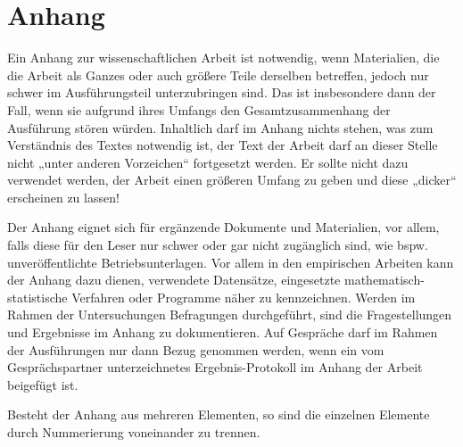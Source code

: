 
\section*{Anhang}
\label{Anhang}

Ein Anhang zur wissenschaftlichen Arbeit ist notwendig, wenn Materialien, die die Arbeit als Ganzes oder auch größere Teile derselben betreffen, jedoch nur schwer im Ausführungsteil unterzubringen sind. Das ist insbesondere dann der Fall, wenn sie aufgrund ihres Umfangs den Gesamtzusammenhang der Ausführung stören würden. Inhaltlich darf im Anhang nichts stehen, was zum Verständnis des Textes notwendig ist, der Text der Arbeit darf an dieser Stelle nicht „unter anderen Vorzeichen“ fortgesetzt werden. Er sollte nicht dazu verwendet werden, der Arbeit einen größeren Umfang zu geben und diese „dicker“ erscheinen zu lassen!

Der Anhang eignet sich für ergänzende Dokumente und Materialien, vor allem, falls diese für den Leser nur schwer oder gar nicht zugänglich sind, wie bspw. unveröffentlichte Betriebsunterlagen.
Vor allem in den empirischen Arbeiten kann der Anhang dazu dienen, verwendete Datensätze, eingesetzte mathematisch-statistische Verfahren oder Programme näher zu kennzeichnen. Werden im Rahmen der Untersuchungen Befragungen durchgeführt, sind die Fragestellungen und Ergebnisse im Anhang zu dokumentieren. Auf Gespräche darf im Rahmen der Ausführungen nur dann Bezug genommen werden, wenn ein vom Gesprächspartner unterzeichnetes Ergebnis-Protokoll im Anhang der Arbeit beigefügt ist.

Besteht der Anhang aus mehreren Elementen, so sind die einzelnen Elemente durch Nummerierung voneinander zu trennen.

